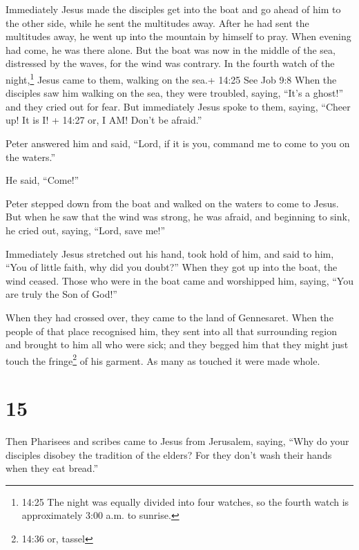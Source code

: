  Immediately Jesus made the disciples get into the boat and
go ahead of him to the other side, while he sent the multitudes away.
 After he had sent the multitudes away, he went up into the
mountain by himself to pray. When evening had come, he was there alone.
 But the boat was now in the middle of the sea, distressed
by the waves, for the wind was contrary.  In the fourth
watch of the night,\footnote{14:25 The night was equally divided into
  four watches, so the fourth watch is approximately 3:00 a.m. to
  sunrise.} Jesus came to them, walking on the sea.+ 14:25 See Job 9:8
 When the disciples saw him walking on the sea, they were
troubled, saying, ``It's a ghost!'' and they cried out for fear.
 But immediately Jesus spoke to them, saying, ``Cheer up!
It is I! + 14:27 or, I AM! Don't be afraid.''

 Peter answered him and said, ``Lord, if it is you, command
me to come to you on the waters.''

 He said, ``Come!''

Peter stepped down from the boat and walked on the waters to come to
Jesus.  But when he saw that the wind was strong, he was
afraid, and beginning to sink, he cried out, saying, ``Lord, save me!''

 Immediately Jesus stretched out his hand, took hold of
him, and said to him, ``You of little faith, why did you doubt?''
 When they got up into the boat, the wind ceased.
 Those who were in the boat came and worshipped him,
saying, ``You are truly the Son of God!''

 When they had crossed over, they came to the land of
Gennesaret.  When the people of that place recognised him,
they sent into all that surrounding region and brought to him all who
were sick;  and they begged him that they might just touch
the fringe\footnote{14:36 or, tassel} of his garment. As many as touched
it were made whole.

\hypertarget{section-14}{%
\section{15}\label{section-14}}

 Then Pharisees and scribes came to Jesus from Jerusalem,
saying,  ``Why do your disciples disobey the tradition of
the elders? For they don't wash their hands when they eat bread.''

